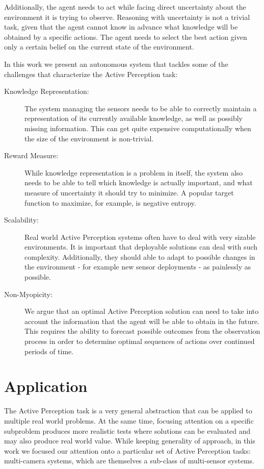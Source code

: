 Additionally, the agent needs to act while facing direct uncertainty about the environment it is
trying to observe. Reasoning with uncertainty is not a trivial task, given that the agent cannot
know in advance what knowledge will be obtained by a specific actions. The agent needs to select the
best action given only a certain belief on the current state of the environment.

In this work we present an autonomous system that tackles some of the challenges that characterize
the Active Perception task:

\begin{description}
\item[Knowledge Representation:] The system managing the sensors needs to be able to correctly
    maintain a representation of its currently available knowledge, as well as possibly missing
    information. This can get quite expensive computationally when the size of the environment is
    non-trivial.
\item[Reward Measure:] While knowledge representation is a problem in itself, the system also needs
    to be able to tell which knowledge is actually important, and what measure of uncertainty it
    should try to minimize. A popular target function to maximize, for example, is negative entropy.
\item[Scalability:] Real world Active Perception systems often have to deal with very sizable
    environments. It is important that deployable solutions can deal with such complexity.
    Additionally, they should able to adapt to possible changes in the environment - for example new
    sensor deployments - as painlessly as possible. 
\item[Non-Myopicity:] We argue that an optimal Active Perception solution can need  to take into
    account the information that the agent will be able to obtain in the future.  This requires the
    ability to forecast possible outcomes from the observation process in order to determine optimal
    sequences of actions over continued periods of time.
\end{description}

\section{Application}

The Active Perception task is a very  general abstraction that can be applied to multiple real world
problems. At the same time, focusing attention on a specific subproblem produces more realistic
tests where solutions can be evaluated and may also produce real world value. While keeping
generality of approach, in this work we focused our attention onto a particular set of Active
Perception tasks: multi-camera systems, which are themselves a sub-class of multi-sensor systems.

